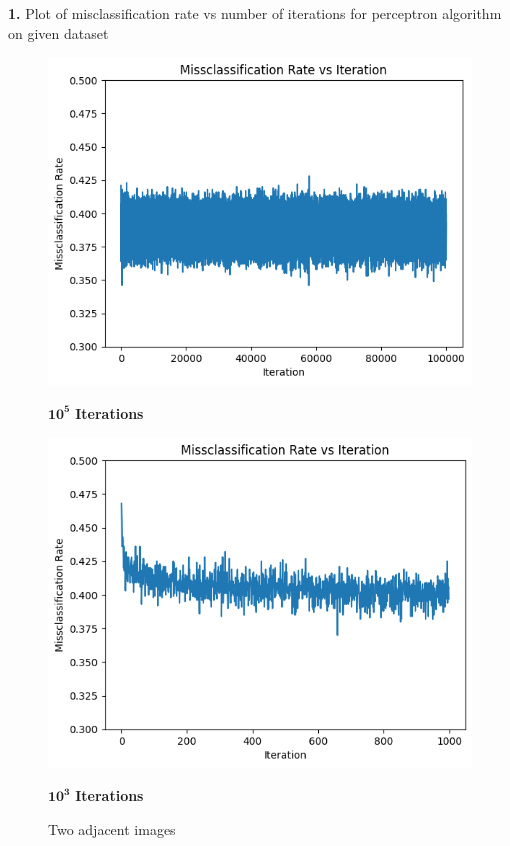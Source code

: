 \documentclass{article}
\begin{document}
\begin{itemize}
    \textbf{1.} Plot of misclassification rate vs number of iterations for perceptron algorithm on given dataset
    \begin{figure}[h]
        \centering
        \begin{minipage}{0.45\textwidth}
            \centering
            \includegraphics[width=\linewidth]{non_convergence_misclassification_vs_iterations.png}
            \caption{$\mathbf{10^5}$ \textbf{ Iterations}}
        \end{minipage}
        \hfill
        \begin{minipage}{0.45\textwidth}
            \centering
            \includegraphics[width=\linewidth]{non_convergence_misclassification_vs_1000iterations.png}
            \caption{$\mathbf{10^3}$ \textbf{ Iterations}}
        \end{minipage}
        \caption{Two adjacent images}
    \end{figure}


\end{itemize}
\end{document}
